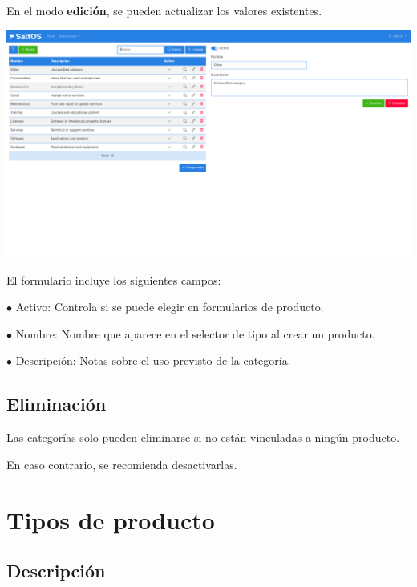 \documentclass[a4paper]{article}
\begin{document}
En el modo \textbf{edición}, se pueden actualizar los valores existentes.

\begin{center}\includegraphics[width=1\textwidth]{../ujest/snaps/test-screenshots-js-screenshots-sales-products-categories-edit-10-es-es-1-snap.png}\end{center}

El formulario incluye los siguientes campos:

\begin{compactitem}
\item[\color{myblue}$\bullet$] Activo: Controla si se puede elegir en formularios de producto.
\item[\color{myblue}$\bullet$] Nombre: Nombre que aparece en el selector de tipo al crear un producto.
\item[\color{myblue}$\bullet$] Descripción: Notas sobre el uso previsto de la categoría.
\end{compactitem}

\hypertarget{toc160}{}
\subsection{Eliminación}

Las categorías solo pueden eliminarse si no están vinculadas a ningún producto.

En caso contrario, se recomienda desactivarlas.


\hypertarget{toc161}{}
\section{Tipos de producto}

\hypertarget{toc162}{}
\subsection{Descripción}
\end{document}
